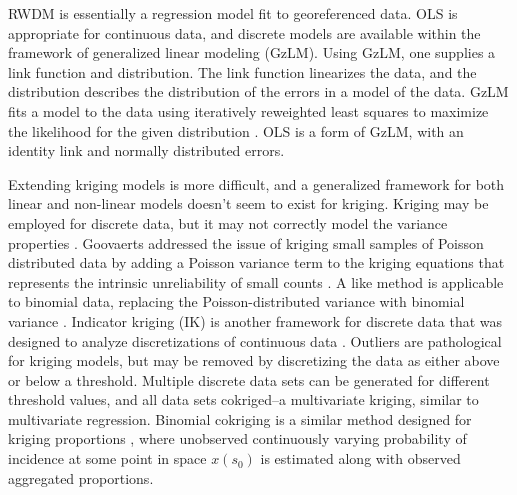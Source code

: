 RWDM is essentially a regression model fit to georeferenced data.  OLS is appropriate for continuous data, and discrete models are available within the framework of generalized linear modeling (GzLM).  Using GzLM, one supplies a link function and distribution.  The link function linearizes the data, and the distribution describes the distribution of the errors in a model of the data.  GzLM fits a model to the data using iteratively reweighted least squares to maximize the likelihood for the given distribution \citep{nelder72}.  OLS is a form of GzLM, with an identity link and normally distributed errors.  %

Extending kriging models is more difficult, and a generalized framework for both linear and non-linear models doesn't seem to exist for kriging.  Kriging may be employed for discrete data, but it may not correctly model the variance properties \citep{goovaerts10}.  Goovaerts addressed the issue of kriging small samples of Poisson distributed data by adding a Poisson variance term to the kriging equations that represents the intrinsic unreliability of small counts \citep{goovaerts06}.  A like method is applicable to binomial data, replacing the Poisson-distributed variance with binomial variance \citep{goovaerts04, goovaerts09}.  Indicator  kriging (IK) is another framework for discrete data that was designed to analyze discretizations of continuous data \citep{journel83}.  Outliers are pathological for kriging models, but may be removed by discretizing the data as either above or below a threshold.  Multiple discrete data sets can be generated for different threshold values, and all data sets cokriged--a multivariate kriging, similar to multivariate regression.  Binomial cokriging is a similar method designed for kriging proportions \citep{lajaunie91, oliver98}, where unobserved continuously varying probability of incidence at some point in space $x(s_0)$ is estimated along with observed aggregated proportions.

